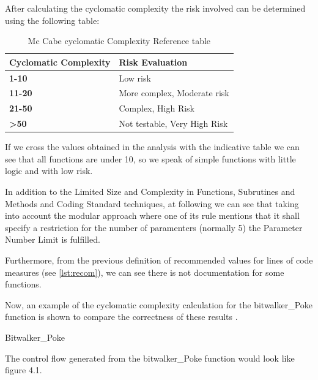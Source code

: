 After calculating the cyclomatic complexity the risk involved can be determined using the following table:

{\footnotesize\sffamily\centering
  \begin{longtable}{||p{}|p{}||}
  \caption{Mc Cabe cyclomatic Complexity Reference table}\\
    \hline\hline
    \textbf{Cyclomatic Complexity} & \textbf{Risk Evaluation} \\
    \hline\hline
    \endhead
    \hline\hline
    \endfoot
    \textbf{1-10}
& Low risk
    \\
    \hline
    \textbf{11-20}
& More complex, Moderate risk
    \\
    \hline
    \textbf{21-50}
& Complex, High Risk
    \\
    \hline
    \textbf{>50}
& Not testable, Very High Risk
    \\
    \hline
\end{longtable}}

If we cross the values ​​obtained in the analysis with the indicative table we can see that all functions are under 10, so we speak of simple functions with little logic and with low risk.

In addition to the Limited Size and Complexity in Functions, Subrutines and Methods and Coding Standard techniques, at following we can see that taking into account the modular approach where one of its rule mentions that it shall specify a restriction for the number of paramenters (normally 5) the Parameter Number Limit is fulfilled.

Furthermore, from the previous definition of recommended values for lines of code measures (see \ref{lst:recom}), we can see there is not documentation for some functions.

Now, an example of the cyclomatic complexity calculation for the bitwalker\_Poke function is shown to compare the correctness of these results .

\begin{listing}[hbt]
\begin{minipage}{\textwidth}

\end{minipage}
\caption{Bitwalker\_Poke}
\end{listing}

The control flow generated from the bitwalker\_Poke function would look like figure 4.1.

